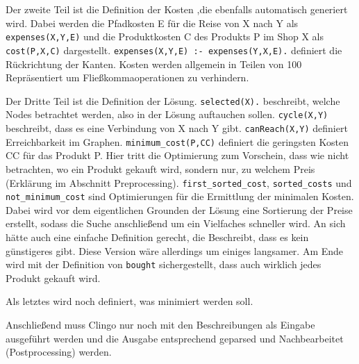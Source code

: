 Der zweite Teil ist die Definition der Kosten ,die ebenfalls automatisch generiert wird. Dabei werden die Pfadkosten E für die Reise von X nach Y als \texttt{expenses(X,Y,E)} und die Produktkosten C des Produkts P im Shop X als \texttt{cost(P,X,C)} dargestellt. \texttt{expenses(X,Y,E) :- expenses(Y,X,E).} definiert die Rückrichtung der Kanten. Kosten werden allgemein in Teilen von 100 Repräsentiert um Fließkommaoperationen zu verhindern. 



Der Dritte Teil ist die Definition der Lösung. \texttt{selected(X).} beschreibt, welche Nodes betrachtet werden, also in der Lösung auftauchen sollen. \texttt{cycle(X,Y)} beschreibt, dass es eine Verbindung von X nach Y gibt. \texttt{canReach(X,Y)} definiert Erreichbarkeit im Graphen. \texttt{minimum\_cost(P,CC)} definiert die geringsten Kosten CC für das Produkt P. Hier tritt die Optimierung zum Vorschein, dass wie nicht betrachten, wo ein Produkt gekauft wird, sondern nur, zu welchem Preis (Erklärung im Abschnitt Preprocessing). \texttt{first\_sorted\_cost}, \texttt{sorted\_costs} und \texttt{not\_minimum\_cost} sind Optimierungen für die Ermittlung der minimalen Kosten. Dabei wird vor dem eigentlichen Grounden der Lösung eine Sortierung der Preise erstellt, sodass die Suche anschließend um ein Vielfaches schneller wird. An sich hätte auch eine einfache Definition gerecht, die Beschreibt, dass es kein günstigeres gibt. Diese Version wäre allerdings um einiges langsamer. Am Ende wird mit der Definition von \texttt{bought} sichergestellt, dass auch wirklich jedes Produkt gekauft wird. 



Als letztes wird noch definiert, was minimiert werden soll.



Anschließend muss Clingo nur noch mit den Beschreibungen als Eingabe ausgeführt werden und die Ausgabe entsprechend geparsed und Nachbearbeitet (Postprocessing) werden.
